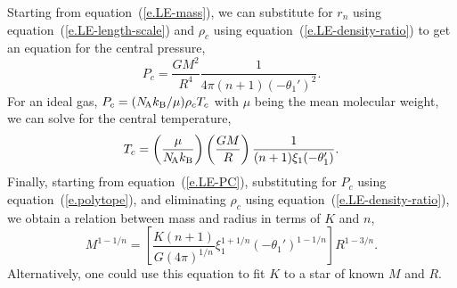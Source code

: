 Starting from equation~(\ref{e.LE-mass}), we can substitute for $r_{n}$ using equation~(\ref{e.LE-length-scale}) and $\rho_{c}$ using equation~(\ref{e.LE-density-ratio}) to get an equation for the central pressure,
\begin{equation}\label{e.LE-PC}
P_{c} = \frac{GM^{2}}{R^{4}} \frac{1}{4\pi(n+1)(-\theta_{1}')^{2}}.
\end{equation}
For an ideal gas, $P_{c} = (N_\mathrm{\!A}k_\mathrm{B}/\mu)\rho_{c}T_{c}$ with $\mu$ being the mean molecular weight, we can solve for the central temperature,
\begin{equation}\label{e.LE-TC}
T_{c} = \left(\frac{\mu}{N_\mathrm{\!A}k_\mathrm{B}}\right)\left(\frac{GM}{R}\right)\frac{1}{(n+1)\xi_{1}(-\theta_{1}')}.
\end{equation}
Finally, starting from equation~(\ref{e.LE-PC}), substituting for $P_{c}$ using equation~(\ref{e.polytope}), and eliminating $\rho_{c}$ using equation~(\ref{e.LE-density-ratio}), we obtain a relation between mass and radius in terms of $K$ and $n$,
\begin{equation}\label{e.LE-mass-radius}
M^{1-1/n} = \left[\frac{K(n+1)}{G(4\pi)^{1/n}} \xi_{1}^{1+1/n}\left(-\theta_{1}'\right)^{1-1/n} \right] R^{1-3/n}.
\end{equation}
Alternatively, one could use this equation to fit $K$ to a star of known $M$ and $R$.

